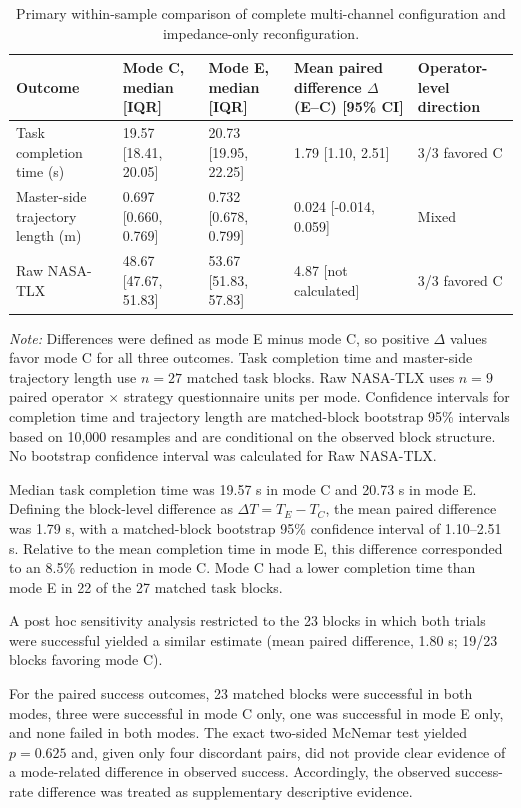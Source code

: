 \begin{table}[!t]
\centering
\caption{Primary within-sample comparison of complete multi-channel configuration and impedance-only reconfiguration.}
\label{tab:9}
\small
\setlength{\tabcolsep}{5pt}
\renewcommand{\arraystretch}{1.16}
\begin{tabularx}{\textwidth}{@{}p{}YYYp{0.20\textwidth}@{}}
\toprule
Outcome & Mode C, median [IQR] & Mode E, median [IQR] & Mean paired difference $\Delta$ (E--C) [95\% CI] & Operator-level direction \\
\midrule
Task completion time (s) & 19.57 [18.41, 20.05] & 20.73 [19.95, 22.25] & 1.79 [1.10, 2.51] & 3/3 favored C \\
Master-side trajectory length (m) & 0.697 [0.660, 0.769] & 0.732 [0.678, 0.799] & 0.024 [-0.014, 0.059] & Mixed \\
Raw NASA-TLX & 48.67 [47.67, 51.83] & 53.67 [51.83, 57.83] & 4.87 [not calculated] & 3/3 favored C \\
\bottomrule
\end{tabularx}
\par\smallskip
\footnotesize\textit{Note:} Differences were defined as mode E minus mode C, so positive $\Delta$ values favor mode C for all three outcomes. Task completion time and master-side trajectory length use $n=27$ matched task blocks. Raw NASA-TLX uses $n=9$ paired operator $\times$ strategy questionnaire units per mode. Confidence intervals for completion time and trajectory length are matched-block bootstrap 95\% intervals based on 10{,}000 resamples and are conditional on the observed block structure. No bootstrap confidence interval was calculated for Raw NASA-TLX.
\end{table}
Median task completion time was 19.57 s in mode C and 20.73 s in mode E. Defining the block-level difference as $\Delta T=T_E-T_C$, the mean paired difference was 1.79 s, with a matched-block bootstrap 95\% confidence interval of 1.10--2.51 s. Relative to the mean completion time in mode E, this difference corresponded to an 8.5\% reduction in mode C. Mode C had a lower completion time than mode E in 22 of the 27 matched task blocks.

A post hoc sensitivity analysis restricted to the 23 blocks in which both trials were successful yielded a similar estimate (mean paired difference, 1.80 s; 19/23 blocks favoring mode C).

For the paired success outcomes, 23 matched blocks were successful in both modes, three were successful in mode C only, one was successful in mode E only, and none failed in both modes. The exact two-sided McNemar test yielded $p=0.625$ and, given only four discordant pairs, did not provide clear evidence of a mode-related difference in observed success. Accordingly, the observed success-rate difference was treated as supplementary descriptive evidence.

